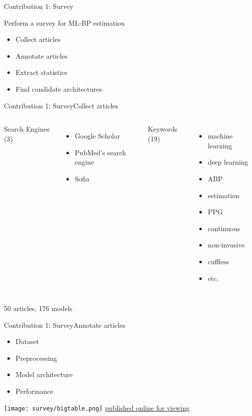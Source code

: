 \begin{frame}{Contribution 1: Survey}
    \begin{block}{Perform a survey for ML-BP estimation}
        \begin{itemize}
            \item Collect articles
            \item Annotate articles
            \item Extract statistics
            \item Find candidate architectures
        \end{itemize}
    \end{block}
\end{frame}

\begin{frame}{Contribution 1: Survey}{Collect articles}
    \begin{columns}
        Search Engines (3)
        \begin{itemize}
            \item Google Scholar
            \item PubMed's search engine
            \item Sofia
        \end{itemize}

        Keywords (19)
        \begin{itemize}
            \item machine learning
            \item deep learning
            \item ABP
            \item estimation
            \item PPG
            \item continuous
            \item non-invasive
            \item cuffless
            \item etc.
        \end{itemize}
    \end{columns}

    \pause
    \vspace{1cm}
    \centering
    \alert{50 articles, 176 models}
\end{frame}

\begin{frame}{Contribution 1: Survey}{Annotate articles}
    \begin{itemize}
        \item Dataset
        \item Preprocessing
        \item Model architecture
        \item Performance
    \end{itemize}
    \texttt{[image: survey/bigtable.png]}
    \href{https://docs.google.com/spreadsheets/u/1/d/e/2PACX-1vR-3MoAcaD-N30ZM15ozSlxh8RHTUBv2KETb9f2g852htlH-5PNt_S8khVnUFLWeEo2H91ZW9hCEi8o/pubhtml}{published online for viewing}
\end{frame}

